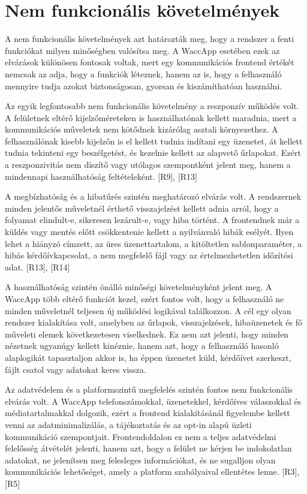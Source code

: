 \section{Nem funkcionális követelmények}

A nem funkcionális követelmények azt határozták meg, hogy a rendszer a fenti funkciókat milyen minőségben valósítsa meg. A WaccApp esetében ezek az elvárások különösen fontosak voltak, mert egy kommunikációs frontend értékét nemcsak az adja, hogy a funkciók léteznek, hanem az is, hogy a felhasználó mennyire tudja azokat biztonságosan, gyorsan és kiszámíthatóan használni.

Az egyik legfontosabb nem funkcionális követelmény a reszponzív működés volt. A felületnek eltérő kijelzőméreteken is használhatónak kellett maradnia, mert a kommunikációs műveletek nem kötődnek kizárólag asztali környezethez. A felhasználónak kisebb kijelzőn is el kellett tudnia indítani egy üzenetet, át kellett tudnia tekinteni egy beszélgetést, és kezelnie kellett az alapvető űrlapokat. Ezért a reszponzivitás nem díszítő vagy utólagos szempontként jelent meg, hanem a mindennapi használhatóság feltételeként. [R9], [R13]

A megbízhatóság és a hibatűrés szintén meghatározó elvárás volt. A rendszernek minden jelentős műveletnél érthető visszajelzést kellett adnia arról, hogy a folyamat elindult-e, sikeresen lezárult-e, vagy hiba történt. A frontendnek már a küldés vagy mentés előtt csökkentenie kellett a nyilvánvaló hibák esélyét. Ilyen lehet a hiányzó címzett, az üres üzenettartalom, a kitöltetlen sablonparaméter, a hibás kérdőívkapcsolat, a nem megfelelő fájl vagy az értelmezhetetlen időzítési adat. [R13], [R14]

A használhatóság szintén önálló minőségi követelményként jelent meg. A WaccApp több eltérő funkciót kezel, ezért fontos volt, hogy a felhasználó ne minden műveletnél teljesen új működési logikával találkozzon. A cél egy olyan rendszer kialakítása volt, amelyben az űrlapok, visszajelzések, hibaüzenetek és fő műveleti elemek következetesen viselkednek. Ez nem azt jelenti, hogy minden nézetnek ugyanúgy kellett kinéznie, hanem azt, hogy a felhasználó hasonló alaplogikát tapasztaljon akkor is, ha éppen üzenetet küld, kérdőívet szerkeszt, fájlt csatol vagy adatokat keres vissza.

Az adatvédelem és a platformszintű megfelelés szintén fontos nem funkcionális elvárás volt. A WaccApp telefonszámokkal, üzenetekkel, kérdőíves válaszokkal és médiatartalmakkal dolgozik, ezért a frontend kialakításánál figyelembe kellett venni az adatminimalizálás, a tájékoztatás és az opt-in alapú üzleti kommunikáció szempontjait. Frontendoldalon ez nem a teljes adatvédelmi felelősség átvételét jelenti, hanem azt, hogy a felület ne kérjen be indokolatlan adatokat, ne jelenítsen meg felesleges információkat, és ne sugalljon olyan kommunikációs lehetőséget, amely a platform szabályaival ellentétes lenne. [R3], [R5]

